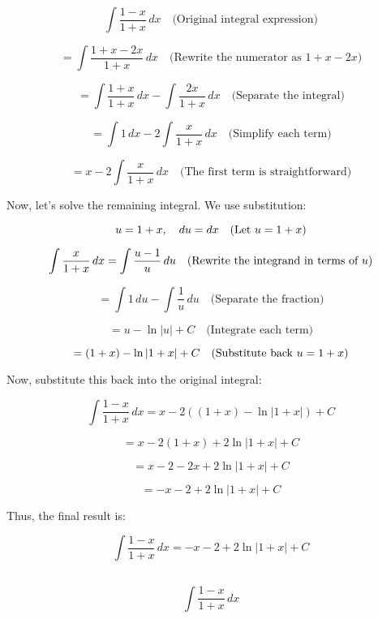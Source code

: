 \documentclass[12pt]{article}
\begin{document}
\subsection{}

	
	\[
	\int \frac{1-x}{1+x} \, dx \quad \text{(Original integral expression)}
	\]
	
	\[
	= \int \frac{1+x - 2x}{1+x} \, dx \quad \text{(Rewrite the numerator as \(1 + x - 2x\))}
	\]
	
	\[
	= \int \frac{1+x}{1+x} \, dx - \int \frac{2x}{1+x} \, dx \quad \text{(Separate the integral)}
	\]
	
	\[
	= \int 1 \, dx - 2 \int \frac{x}{1+x} \, dx \quad \text{(Simplify each term)}
	\]
	
	\[
	= x - 2 \int \frac{x}{1+x} \, dx \quad \text{(The first term is straightforward)}
	\]
	
	Now, let’s solve the remaining integral. We use substitution:
	
	\[
	u = 1 + x, \quad du = dx \quad \text{(Let \( u = 1 + x \))}
	\]
	
	\[
	\int \frac{x}{1+x} \, dx = \int \frac{u-1}{u} \, du \quad \text{(Rewrite the integrand in terms of \( u \))}
	\]
	
	\[
	= \int 1 \, du - \int \frac{1}{u} \, du \quad \text{(Separate the fraction)}
	\]
	
	\[
	= u - \ln |u| + C \quad \text{(Integrate each term)}
	\]
	
	\[
	= (1+x) - \ln |1+x| + C \quad \text{(Substitute back \( u = 1+x \))}
	\]
	
	Now, substitute this back into the original integral:
	
	\[
	\int \frac{1-x}{1+x} \, dx = x - 2 \left( (1+x) - \ln |1+x| \right) + C
	\]
	
	\[
	= x - 2(1+x) + 2\ln |1+x| + C
	\]
	
	\[
	= x - 2 - 2x + 2\ln |1+x| + C
	\]
	
	\[
	= -x - 2 + 2\ln |1+x| + C
	\]
	
	Thus, the final result is:
	
	\[
	\int \frac{1-x}{1+x} \, dx = -x - 2 + 2\ln |1+x| + C
	\]
	
\subsection{}


\[
\int \frac{1-x}{1+x} \, dx 
\]
\end{document}
